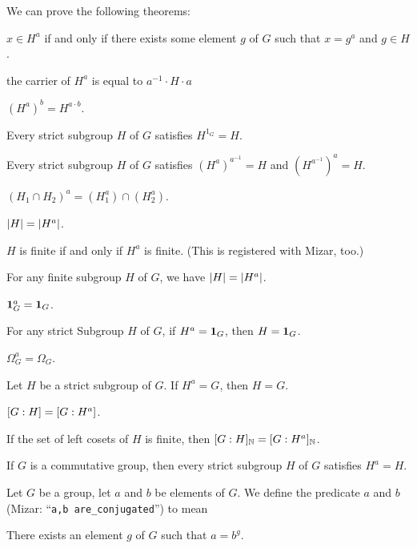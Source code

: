 \documentclass{article}
\begin{document}
We can prove the following theorems:
\begin{thm}
\item\label{group3:58} $x\in H^{a}$ if and only if there exists some
  element $g$ of $G$ such that $x=g^{a}$ and $g\in H$.
\item\label{group3:59} the carrier of $H^{a}$ is equal to $a^{-1}\cdot H\cdot a$
\item\label{group3:60} $(H^{a})^{b}=H^{a\cdot b}$.
\item\label{group3:61} Every strict subgroup $H$ of $G$ satisfies $H^{1_{G}}=H$.
\item\label{group3:62} Every strict subgroup $H$ of $G$ satisfies $(H^{a})^{a^{-1}}=H$
  and $(H^{a^{-1}})^{a}=H$.
\item\label{group3:63} $(H_{1}\cap H_{2})^{a}=(H_{1}^{a})\cap(H_{2}^{a})$.
\item\label{group3:64} $|H|=|H^{a}|$.
\item\label{group3:65} $H$ is finite if and only if $H^{a}$ is
  finite. (This is registered with Mizar, too.)
\item\label{group3:66} For any finite subgroup $H$ of $G$, we have $|H|=|H^{a}|$.
\item\label{group3:67} $\mathbf{1}_{G}^{a}=\mathbf{1}_{G}$.
\item\label{group3:68} For any strict Subgroup $H$ of $G$, if
  $H^{a}=\mathbf{1}_{G}$, then $H=\mathbf{1}_{G}$.
\item\label{group3:69} $\Omega_{G}^{a}=\Omega_{G}$.
\item\label{group3:70} Let $H$ be a strict subgroup of $G$. If
  $H^{a}=G$, then $H=G$.
\item\label{group3:71} $[G : H]=[G : H^{a}]$.
\item\label{group3:72} If the set of left cosets of $H$ is finite, then $[G : H]_{\mathbb{N}}=[G : H^{a}]_{\mathbb{N}}$.
\item\label{group3:73} If $G$ is a commutative group, then every strict
  subgroup $H$ of $G$ satisfies $H^{a}=H$.
\end{thm}

\begin{definition}
Let $G$ be a group, let $a$ and $b$ be elements of $G$.
We define the predicate $a$ and $b$  (Mizar:
``\verb#a,b are_conjugated#'') to mean
\begin{defn}
\item There exists an element $g$ of $G$ such that $a=b^{g}$.
\end{defn}
\end{definition}
\end{document}
